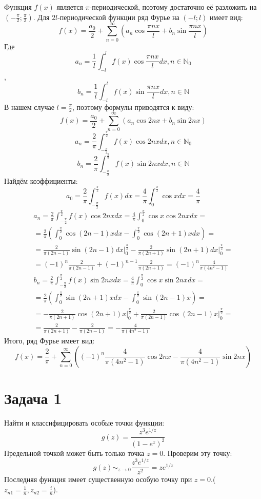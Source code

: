 \documentclass[11pt]{article}
\begin{document}
Функция \(f(x)\) является \(\pi\)-периодической, поэтому достаточно её разложить на \(\left(-\frac{\pi}2; \frac{\pi}2\right)\).
Для \(2l\)-периодической функции ряд Фурье на \((-l; l)\) имеет вид:
$$f(x) = \frac{a_0}2 + \sum_{n = 0}^\infty\left(a_n\cos\frac{\pi nx}l + b_n\sin\frac{\pi nx}l\right)$$
Где
$$a_n = \frac{1}l\int_{-l}^lf(x)\cos\frac{\pi nx}ldx, n \in \mathbb{N}_0$$, $$b_n = \frac{1}l\int_{-l}^lf(x)\sin\frac{\pi nx}ldx, n \in \mathbb{N}$$
В нашем случае \(l = \frac{\pi}2\), поэтому формулы приводятся к виду:
$$f(x) = \frac{a_0}2 + \sum_{n = 0}^\infty\left(a_n\cos 2nx + b_n\sin 2nx\right)$$
$$a_n = \frac{2}\pi\int_{-\frac{\pi}2}^{\frac{\pi}2}f(x)\cos 2nxdx, n \in \mathbb{N}_0$$
$$b_n = \frac{2}\pi\int_{-\frac{\pi}2}^{\frac{\pi}2}f(x)\sin 2nxdx, n \in \mathbb{N}$$
Найдём коэффициенты:
$$a_0 = \frac{2}\pi\int_{-\frac{\pi}2}^\frac{\pi}2f(x)dx = \frac{4}\pi\int_0^\frac{\pi}2\cos xdx = \frac{4}\pi$$
\begin{multline*}
a_n = \frac{2}\pi\int_{-\frac{\pi}2}^\frac{\pi}2f(x)\cos 2nxdx = \frac{4}\pi\int_0^\frac{\pi}2\cos x\cos 2nxdx = \\
 = \frac{2}\pi\left(\int_0^\frac{\pi}2\cos(2n-1)xdx - \int_0^\frac{\pi}2\cos(2n+1)xdx\right) = \\
 = \frac{2}{\pi(2n - 1)}\sin(2n-1)dx\bigg|_0^\frac{\pi}2 - \frac{2}{\pi(2n+1)}\sin(2n+1)dx\bigg|_0^\frac{\pi}2 = \\
 = (-1)^n\frac{2}{\pi(2n-1)} + (-1)^{n-1}\frac{2}{\pi(2n+1)} = (-1)^n\frac{4}{\pi(4n^2 - 1)}
\end{multline*}
\begin{multline*}
b_n = \frac{2}\pi\int_{-\frac{\pi}2}^\frac{\pi}2f(x)\sin 2nxdx = \frac{4}\pi\int_0^\frac{\pi}2\cos x\sin 2nxdx = \\
 = \frac{2}\pi\left(\int_0^\frac{\pi}2\sin(2n+1)xdx - \int_0^\frac{\pi}2\sin(2n-1)x\right) = \\
 = -\frac{2}{\pi(2n+1)}\cos(2n+1)x\bigg|_0^\frac{\pi}2 + \frac{2}{\pi(2n-1)}\cos(2n-1)x\bigg|_0^\frac{\pi}2 = \\
 = \frac{2}{\pi(2n+1)} - \frac{2}{\pi(2n - 1)} = -\frac{4}{\pi(4n^2-1)}
\end{multline*}
Итого, ряд Фурье имеет вид:
$$f(x) = \frac{2}\pi + \sum_{n = 0}^\infty\left((-1)^n\frac{4}{\pi(4n^2-1)}\cos 2nx - \frac{4}{\pi(4n^2-1)}\sin 2nx\right)$$
\section{Задача 1}
\label{sec:orgcbab40e}
Найти и классифицировать особые точки функции:
$$g(z) = \frac{z^3e^{1/z}}{(1 - e^z)^2}$$
Предельной точкой может быть только точка \(z = 0\). Проверим эту точку:
$$g(z) \sim_{z \to 0} \frac{z^3e^{1/z}}{z^2} = ze^{1/z}$$
Последняя функция имеет существенную особую точку при \(z = 0\).(\(z_{n1} = \frac{1}n, z_{n2} = \frac{i}n\)).
\end{document}
